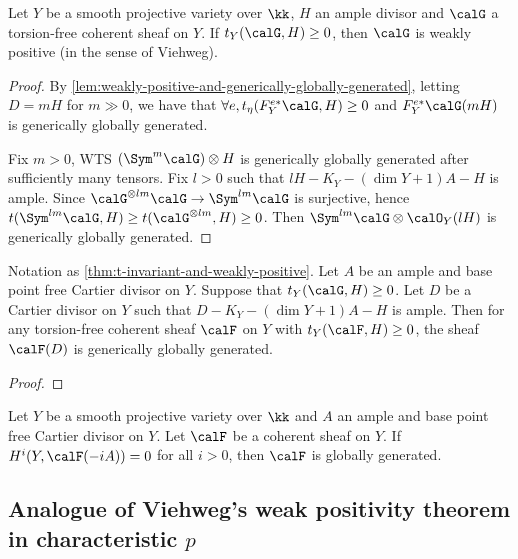 \begin{theorem}\label{thm:t-invariant-and-weakly-positive}
	Let $Y$ be a smooth projective variety over $\kk$, $H$ an ample divisor and $\calG$ a torsion-free coherent sheaf on $Y$.
	If $t_Y(\calG,H) \geq 0$, then $\calG$ is weakly positive (in the sense of Viehweg).
\end{theorem}
\begin{proof}
	By \cref{lem:weakly-positive-and-generically-globally-generated}, letting $D = mH$ for $m \gg 0$, we have that $\forall e, t_\eta(F_Y^{e*}\calG,H) \geq 0$ and $F_Y^{e*}\calG(mH)$ is generically globally generated.

	Fix $m>0$, WTS $(\Sym^m \calG) \otimes H$ is generically globally generated after sufficiently many tensors.
	Fix $l>0$ such that $lH - K_Y - (\dim Y + 1)A - H$ is ample.
	Since $\calG^{\otimes lm} \calG \to \Sym^{lm} \calG$ is surjective, hence $t(\Sym^{lm} \calG,H) \geq t(\calG^{\otimes lm},H) \geq 0$.
	Then $\Sym^{lm} \calG \otimes \calO_Y(lH)$ is generically globally generated.


	\Yang{}
\end{proof}

\begin{lemma}\label{lem:weakly-positive-and-generically-globally-generated}
	Notation as \cref{thm:t-invariant-and-weakly-positive}.
	Let $A$ be an ample and base point free Cartier divisor on $Y$.
	Suppose that $t_Y(\calG,H) \geq 0$.
	Let $D$ be a Cartier divisor on $Y$ such that $D-K_Y-(\dim Y + 1)A - H$ is ample.
	Then for any torsion-free coherent sheaf $\calF$ on $Y$ with $t_Y(\calF,H) \geq 0$, the sheaf $\calF(D)$ is generically globally generated.
\end{lemma}
\begin{proof}
	\Yang{}
\end{proof}


\begin{theorem}\label{thm:mumford-regularity}
	Let $Y$ be a smooth projective variety over $\kk$ and $A$ an ample and base point free Cartier divisor on $Y$.
	Let $\calF$ be a coherent sheaf on $Y$.
	If $H^i(Y, \calF(-iA)) = 0$ for all $i>0$, then $\calF$ is globally generated.
	\Yang{}
\end{theorem}


\subsection[Analogue of Viehweg's weak positivity theorem in characteristic p]{Analogue of Viehweg's weak positivity theorem in characteristic $p$}



